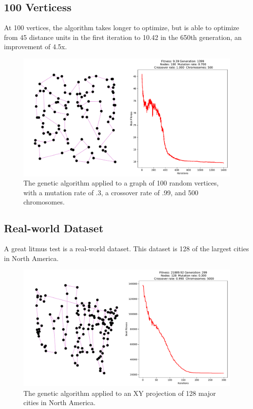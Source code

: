\subsection{100 Verticess}

At 100 vertices, the algorithm takes longer to optimize, but is able to optimize from 45 distance units in the first iteration to 10.42 in the 650th generation, an improvement of 4.5x.

\begin{figure}[H]
\centering
\includegraphics[width=6in]{images/100.pdf}
\caption{The genetic algorithm applied to a graph of 100 random vertices, with a mutation rate of .3, a crossover rate of .99, and 500 chromosomes.}
\label{fig:somthing}
\end{figure}

\subsection{Real-world Dataset}

A great litmus test is a real-world dataset. This dataset is 128 of the largest cities in North America.

\begin{figure}[H]
\centering
\includegraphics[width=6in]{images/north_america.pdf}
\caption{The genetic algorithm applied to an XY projection of 128 major cities in North America.}
\label{fig:somthing}
\end{figure}